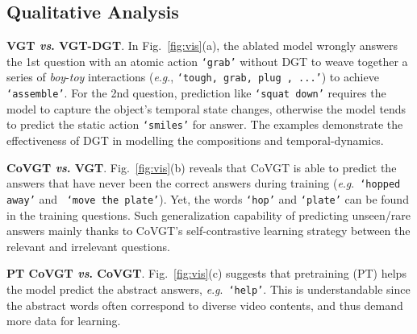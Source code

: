 \documentclass[10pt,journal,compsoc]{IEEEtran}
\newcommand{\vs}{\textit{vs}. }
\newcommand{\eg}{\textit{e}.\textit{g}.}
\begin{document}
\subsection{Qualitative Analysis}
\label{sec:qua}
\textbf{VGT \vs VGT-DGT}.
In Fig.~\ref{fig:vis}(a), the ablated model wrongly answers the 1st question with an atomic action \texttt{`grab'} without DGT to weave together a series of \emph{boy}-\emph{toy} interactions (\eg, \texttt{`tough, grab, plug , ...'}) to achieve \texttt{`assemble'}. For the 2nd question, prediction like \texttt{`squat down'} requires the model to capture the object's temporal state changes, otherwise the model tends to predict the static action \texttt{`smiles'} for answer. The examples demonstrate the effectiveness of DGT in modelling the compositions and temporal-dynamics.

\textbf{CoVGT \vs VGT}.
Fig.~\ref{fig:vis}(b) reveals that CoVGT is able to predict the answers that have never been the correct answers during training (\eg~\texttt{`hopped away'} and ~\texttt{`move the plate'}). Yet, the words \texttt{`hop'} and \texttt{`plate'} can be found in the training questions. Such generalization capability of predicting unseen/rare answers mainly thanks to CoVGT's self-contrastive learning strategy between the relevant and irrelevant questions.

\textbf{PT CoVGT \vs CoVGT}.
Fig.~\ref{fig:vis}(c) suggests that pretraining (PT) helps the model predict the abstract answers, \eg~\texttt{`help'}. This is understandable since the abstract words often correspond to diverse video contents, and thus demand more data for learning.
\end{document}
